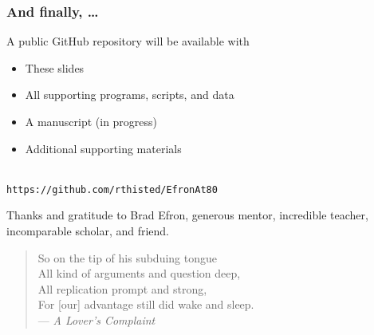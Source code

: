 \begin{frame}
	\frametitle{And finally, \dots}
	
A public GitHub repository will be available with
		\begin{itemize}
			\item These slides
			\item All supporting programs, scripts, and data
			\item A manuscript (in progress)
			\item Additional supporting materials
		\end{itemize}
		\strut\\
		\texttt{https://github.com/rthisted/EfronAt80}
	\bigskip
	
	Thanks and gratitude to Brad Efron, generous mentor, incredible teacher, incomparable scholar, and friend.
	
	\bigskip
	\begin{quotation}
		 	So on the tip of his subduing tongue\\
		 	All kind of arguments and question deep,\\
		 	All replication prompt and strong,\\
		 	For [our] advantage still did wake and sleep.\\
		 {\qquad\qquad--- \textit{A Lover's Complaint}} %
	\end{quotation}
	
\end{frame}